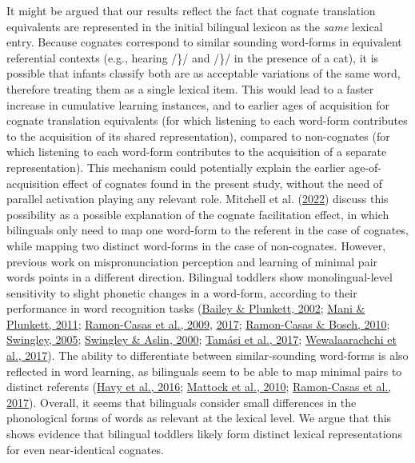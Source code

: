 \documentclass[
]{article}
\begin{document}
It might be argued that our results reflect the fact that cognate
translation equivalents are represented in the initial bilingual lexicon
as the \emph{same} lexical entry. Because cognates correspond to similar
sounding word-forms in equivalent referential contexts (e.g., hearing
/\}/ and /\}/ in the presence of a cat),
it is possible that infants classify both are as acceptable variations
of the same word, therefore treating them as a single lexical item. This
would lead to a faster increase in cumulative learning instances, and to
earlier ages of acquisition for cognate translation equivalents (for
which listening to each word-form contributes to the acquisition of its
shared representation), compared to non-cognates (for which listening to
each word-form contributes to the acquisition of a separate
representation). This mechanism could potentially explain the earlier
age-of-acquisition effect of cognates found in the present study,
without the need of parallel activation playing any relevant role.
Mitchell et al. (\protect\hyperlink{ref-mitchell2022cognates}{2022})
discuss this possibility as a possible explanation of the cognate
facilitation effect, in which bilinguals only need to map one word-form
to the referent in the case of cognates, while mapping two distinct
word-forms in the case of non-cognates. However, previous work on
mispronunciation perception and learning of minimal pair words points in
a different direction. Bilingual toddlers show monolingual-level
sensitivity to slight phonetic changes in a word-form, according to
their performance in word recognition tasks
(\protect\hyperlink{ref-bailey2002phonological}{Bailey \& Plunkett,
2002}; \protect\hyperlink{ref-mani2011does}{Mani \& Plunkett, 2011};
\protect\hyperlink{ref-ramon-casas2009vowel}{Ramon-Casas et al., 2009},
\protect\hyperlink{ref-ramon-casas2017minimalpair}{2017};
\protect\hyperlink{ref-ramon-casas2010are}{Ramon-Casas \& Bosch, 2010};
\protect\hyperlink{ref-swingley200511montholds}{Swingley, 2005};
\protect\hyperlink{ref-swingley2000spoken}{Swingley \& Aslin, 2000};
\protect\hyperlink{ref-tamasi2017pupillometry}{Tamási et al., 2017};
\protect\hyperlink{ref-wewalaarachchi2017vowels}{Wewalaarachchi et al.,
2017}). The ability to differentiate between similar-sounding word-forms
is also reflected in word learning, as bilinguals seem to be able to map
minimal pairs to distinct referents
(\protect\hyperlink{ref-havy2016phonetic}{Havy et al., 2016};
\protect\hyperlink{ref-mattock2010first}{Mattock et al., 2010};
\protect\hyperlink{ref-ramon-casas2017minimalpair}{Ramon-Casas et al.,
2017}). Overall, it seems that bilinguals consider small differences in
the phonological forms of words as relevant at the lexical level. We
argue that this shows evidence that bilingual toddlers likely form
distinct lexical representations for even near-identical cognates.
\end{document}
